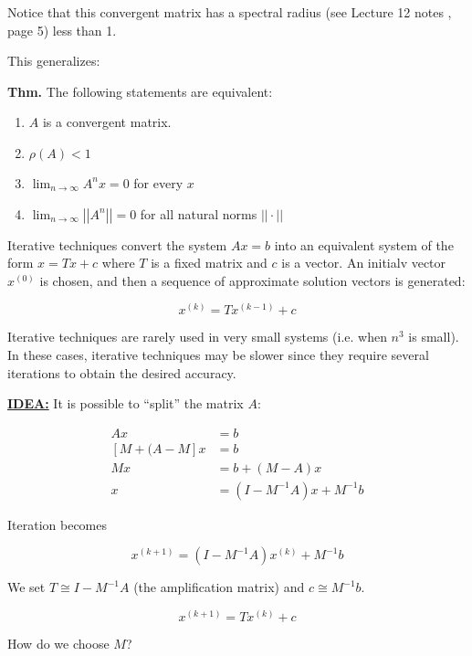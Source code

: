 \documentclass[12pt]{article}
\newcommand{\thm}{\textbf{Thm.}\xspace}
\begin{document}
Notice that this convergent matrix has a spectral radius (see Lecture 12 notes
, page 5) less than 1.

This generalizes:
\pagebreak

\thm The following statements are equivalent:

\begin{enumerate}
  \item $A$ is a convergent matrix.
  \item $\rho(A) < 1$
  \item $\lim_{n\to\infty} A^n x = 0$ for every $x$
  \item $\lim_{n\to\infty} \left|\left|A^n\right|\right| = 0$ for all natural
    norms $||\cdot||$
\end{enumerate}

Iterative techniques convert the system $Ax=b$ into an equivalent system of
the form $x=Tx+c$ where $T$ is a fixed matrix and $c$ is a vector. An initialv
vector $x^{(0)}$ is chosen, and then a sequence of approximate solution vectors
is generated:

\begin{equation*}
  x^{(k)} = Tx^{(k-1)} + c
\end{equation*}

Iterative techniques are rarely used in very small systems 
(i.e. when $n^3$ is small). In these cases, iterative techniques may be slower 
since they require several iterations to obtain the desired accuracy.

\uline{\textbf{IDEA:}} It is possible to \enquote{split} the matrix $A:$

\begin{align*}
  Ax&=b \\
  \left[M+(A-M\right]x &= b \\
  Mx &= b+(M-A)x \\ 
  x &= (I-M^{-1}A)x + M^{-1}b 
\end{align*}

Iteration becomes 

\begin{equation*}
  x^{(k+1)} = (I-M^{-1}A)x^{(k)} + M^{-1}b
\end{equation*}

We set $T\cong I-M^{-1}A$ (the amplification matrix) and $c\cong M^{-1}b$.

\begin{equation*}
  x^{(k+1)} = Tx^{(k)} + c
\end{equation*}

How do we choose $M$?
\end{document}
